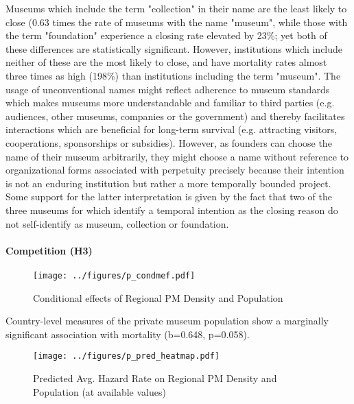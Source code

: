 \documentclass[12pt]{article}
\begin{document}
Museums which include the term "collection" in their name are the least likely to close (0.63 times the rate of museums with the name "museum", while those with the term "foundation" experience a closing rate elevated by 23\%; yet both of these differences are statistically significant.
However, institutions which include neither of these are the most likely to close, and have mortality rates almost three times as high (198\%) than institutions including the term "museum".
The usage of unconventional names might reflect adherence to museum standards which makes museums more understandable and familiar to third parties (e.g. audiences, other museums, companies or the government) and thereby facilitates interactions which are beneficial for long-term survival (e.g. attracting visitors, cooperations, sponsorships or subsidies).
However, as founders can choose the name of their museum arbitrarily, they might choose a name without reference to organizational forms associated with perpetuity precisely because their intention is not an enduring institution but rather a more temporally bounded project.
Some support for the latter interpretation is given by the fact that two of the three museums for which \textcite{Velthuis_Gera_2024_fragility} identify a temporal intention as the closing reason do not self-identify as museum, collection or foundation.
\paragraph*{Competition (H3)}


\begin{figure}[htbp]
\centering
\texttt{[image: ../figures/p\_condmef.pdf]}
\caption{\label{fig:p_condmef}Conditional effects of Regional PM Density and Population}
\end{figure}


Country-level measures of the private museum population show a marginally significant association with mortality (b=0.648, p=0.058).
\begin{figure}[htbp]
\centering
\texttt{[image: ../figures/p\_pred\_heatmap.pdf]}
\caption{\label{fig:p_pred_heatmap}Predicted Avg. Hazard Rate on Regional PM Density and Population (at available values)}
\end{figure}
\end{document}
